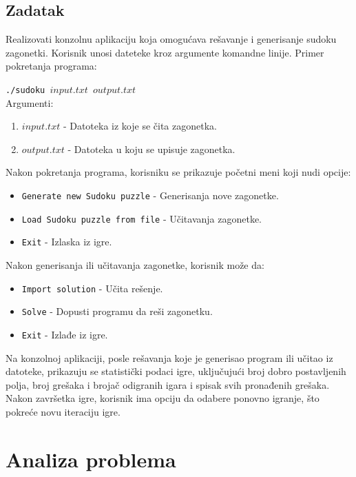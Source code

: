 \documentclass[a4paper]{article}
\begin{document}
    \subsection{Zadatak}
    Realizovati konzolnu aplikaciju koja omogućava rešavanje i generisanje sudoku zagonetki. Korisnik unosi dateteke kroz argumente komandne linije. 
    Primer pokretanja programa:
    \par\texttt{./sudoku $input.txt$ $output.txt$}\\
    Argumenti:
    \begin{enumerate}
        \item $input.txt$ - Datoteka iz koje se čita zagonetka.
        \item $output.txt$ - Datoteka u koju se upisuje zagonetka.
    \end{enumerate}
    \par Nakon pokretanja programa, korisniku se prikazuje početni meni koji nudi opcije:
    \begin{itemize}
        \item \texttt{Generate new Sudoku puzzle} - Generisanja nove zagonetke.
        \item \texttt{Load Sudoku puzzle from file} - Učitavanja zagonetke.
        \item \texttt{Exit} - Izlaska iz igre.
    \end{itemize}
    Nakon generisanja ili učitavanja zagonetke, korisnik može da:
    \begin{itemize}
        \item \texttt{Import solution} - Učita rešenje.
        \item \texttt{Solve} - Dopusti programu da reši zagonetku.
        \item \texttt{Exit} - Izlađe iz igre.
    \end{itemize}
    \par Na konzolnoj aplikaciji, posle rešavanja koje je generisao program ili učitao iz datoteke, prikazuju se statistički podaci igre, uključujući broj dobro 
    postavljenih polja, broj grešaka i brojač odigranih igara i spisak svih pronađenih grešaka. Nakon završetka igre, korisnik ima opciju da odabere ponovno igranje, 
    što pokreće novu iteraciju igre.
    \newpage

    \section{Analiza problema}
    \newpage
\end{document}
